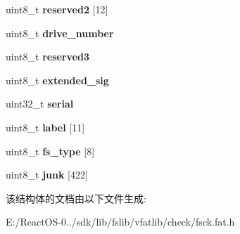 \begin{DoxyCompactItemize}
uint8\+\_\+t {\bfseries reserved2} \mbox{[}12\mbox{]}
\item 
\mbox{\label{structboot__sector_a835a794286c41ce80ee0199d803f2dc8}} 
uint8\+\_\+t {\bfseries drive\+\_\+number}
\item 
\mbox{\label{structboot__sector_a40a91e843b9e5b6d0f5c7d857160a23e}} 
uint8\+\_\+t {\bfseries reserved3}
\item 
\mbox{\label{structboot__sector_a3586aac0cbea4bc6c2321768085515c2}} 
uint8\+\_\+t {\bfseries extended\+\_\+sig}
\item 
\mbox{\label{structboot__sector_a17c45803e070aac182a3e03d32eac8ec}} 
uint32\+\_\+t {\bfseries serial}
\item 
\mbox{\label{structboot__sector_a9801c9050b8b843f37a9d63cad697625}} 
uint8\+\_\+t {\bfseries label} \mbox{[}11\mbox{]}
\item 
\mbox{\label{structboot__sector_a06b4d829ebbdd8e037c7aaa8b8902f03}} 
uint8\+\_\+t {\bfseries fs\+\_\+type} \mbox{[}8\mbox{]}
\item 
\mbox{\label{structboot__sector_ad0ec94317120f6818ada119a101940b7}} 
uint8\+\_\+t {\bfseries junk} \mbox{[}422\mbox{]}
\end{DoxyCompactItemize}


该结构体的文档由以下文件生成\+:\begin{DoxyCompactItemize}
\item 
E\+:/\+React\+O\+S-\/0../sdk/lib/fslib/vfatlib/check/fsck.\+fat.\+h\end{DoxyCompactItemize}
